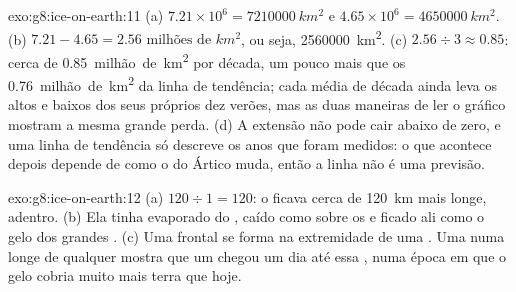 \begin{solution}{exo:g8:ice-on-earth:11}
(a) $7.21 \times 10^6 = \qty{7210000}{km^2}$ e $4.65 \times 10^6 =
\qty{4650000}{km^2}$. (b) $7.21 - 4.65 = \num{2.56}\text{ milhões de }\unit{km^2}$, ou
seja, \qty{2560000}{km^2}. (c) $2.56 \div 3 \approx 0.85$: cerca de
\num{0.85}~milhão~de~\unit{km^2} por década, um pouco mais que os
\num{0.76}~milhão~de~\unit{km^2} da linha de tendência; cada média de década ainda leva os altos e baixos
dos seus próprios dez verões, mas as duas maneiras de ler o gráfico mostram
a mesma grande perda. (d) A extensão não pode cair abaixo de zero, e uma
linha de tendência só descreve os anos que foram medidos: o que acontece
depois depende de como o  do Ártico muda, então a linha não é uma
previsão.
\end{solution}

\begin{solution}{exo:g8:ice-on-earth:12}
(a) $120 \div 1 = 120$: o  ficava cerca de \qty{120}{km} mais longe,
 adentro. (b) Ela tinha evaporado do , caído como  sobre os
 e ficado ali como o gelo dos grandes . (c) Uma
 frontal se forma na extremidade de uma . Uma  numa
 longe de qualquer  mostra que um  chegou um
dia até essa , numa época em que o gelo cobria muito mais terra
que hoje.
\end{solution}

